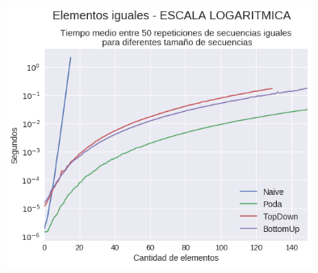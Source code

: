 {\centering
  \includegraphics[width=0.75\textwidth]{informe/img/experimentos/todos-iguales-logaritmica.png} \\
}
